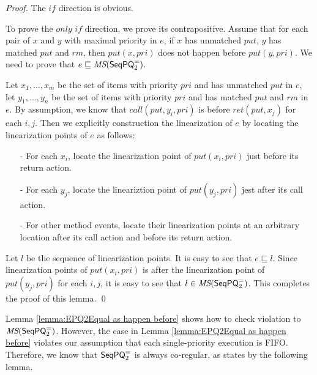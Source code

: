 \begin {proof}

The $\textit{if}$ direction is obvious.

To prove the $\textit{only if}$ direction, we prove its contrapositive. Assume that for each pair of $x$ and $y$ with maximal priority in $e$, if $x$ has unmatched $\textit{put}$, $y$ has matched $\textit{put}$ and $\textit{rm}$, then $\textit{put}(x,\textit{pri})$ does not happen before $\textit{put}(y,\textit{pri})$. We need to prove that $e \sqsubseteq \textit{MS}(\mathsf{SeqPQ}_2^{=})$.

Let $x_1,\ldots,x_m$ be the set of items with priority $\textit{pri}$ and has unmatched $\textit{put}$ in $e$, let $y_1,\ldots,y_n$ be the set of items with priority $\textit{pri}$ and has matched $\textit{put}$ and $\textit{rm}$ in $e$. By assumption, we know that $\textit{call}(\textit{put},y_i,\textit{pri})$ is before $\textit{ret}(\textit{put},x_j)$ for each $i,j$. Then we explicitly construction the linearization of $e$ by locating the linearization points of $e$ as follows:

\begin{itemize}
\setlength{\itemsep}{0.5pt}
\item[-] For each $x_i$, locate the linearization point of $\textit{put}(x_i,\textit{pri})$ just before its return action.

\item[-] For each $y_j$, locate the lineariztion point of $\textit{put}(y_j,\textit{pri})$ jest after its call action.

\item[-] For other method events, locate their linearization points at an arbitrary location after its call action and before its return action.
\end{itemize}

Let $l$ be the sequence of linearization points. It is easy to see that $e \sqsubseteq l$. Since linearization points of $\textit{put}(x_i,\textit{pri})$ is after the linearization point of $\textit{put}(y_j,\textit{pri})$ for each $i,j$, it is easy to see that $l \in \textit{MS}(\mathsf{SeqPQ}_2^{=})$. This completes the proof of this lemma. \qed
\end {proof}

Lemma \ref{lemma:EPQ2Equal as happen before} shows how to check violation to $\textit{MS}(\mathsf{SeqPQ}_2^{=})$. However, the case in Lemma \ref{lemma:EPQ2Equal as happen before} violates our assumption that each single-priority execution is FIFO. Therefore, we know that $\mathsf{SeqPQ}_2^{=}$ is always co-regular, as states by the following lemma.

